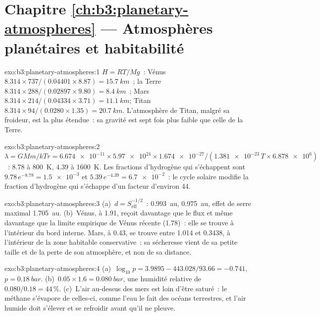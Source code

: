 \section*{Chapitre \ref{ch:b3:planetary-atmospheres} --- Atmosphères planétaires et habitabilité}

\begin{solution}{exo:b3:planetary-atmospheres:1}
$H = RT/Mg$~: Vénus $8.314\times737/(0.04401\times8.87) = \qty{15.7}{km}$~;
la Terre $8.314\times288/(0.02897\times9.80) = \qty{8.4}{km}$~; Mars
$8.314\times214/(0.04334\times3.71) = \qty{11.1}{km}$; Titan
$8.314\times94/(0.0280\times1.35) = \qty{20.7}{km}$. L'atmosphère de Titan,
malgré sa froideur, est la plus étendue~: sa gravité est sept fois plus faible
que celle de la Terre.
\end{solution}

\begin{solution}{exo:b3:planetary-atmospheres:2}
$\lambda = GMm/kTr = \num{6.674e-11}\times\num{5.97e24}\times\num{1.674e-27}
/(\num{1.381e-23}\,T\times\num{6.878e6})$~: 8.78 à \qty{800}{K}, 4.39 à
\qty{1600}{K}. Les fractions d'hydrogène qui s'échappent sont $9.78\,e^{-8.78} =
\num{1.5e-3}$ et $5.39\,e^{-4.39} = \num{6.7e-2}$~: le cycle solaire
modifie la fraction d'hydrogène qui s'échappe d'un facteur d'environ 44.
\end{solution}

\begin{solution}{exo:b3:planetary-atmospheres:3}
(a)~$d = S_\mathrm{eff}^{-1/2}$~:  \qty{0.993}{au}, 
\qty{0.975}{au}, effet de serre maximal \qty{1.705}{au}. (b)~Vénus, à 1.91,
reçoit davantage que le flux  et même davantage que la limite empirique
de Vénus récente (1.78)~: elle se trouve à l'intérieur du bord interne. Mars, à 0.43,
se trouve entre 1.014 et 0.3438, à l'intérieur de la zone habitable conservative~:
sa sécheresse vient de sa petite taille et de la perte de son atmosphère, et non
de sa distance.
\end{solution}

\begin{solution}{exo:b3:planetary-atmospheres:4}
(a)~$\log_{10}p = 3.9895 - 443.028/93.66 = -0.741$, $p =
\qty{0.18}{bar}$. (b)~$0.05\times1.6 = \qty{0.080}{bar}$, une humidité relative
de $0.080/0.18 = 44\,\%$. (c)~L'air au-dessus des mers est loin
d'être saturé~: le méthane s'évapore de celles-ci, comme l'eau le fait des
océans terrestres, et l'air humide doit s'élever et se refroidir avant qu'il ne pleuve.
\end{solution}

